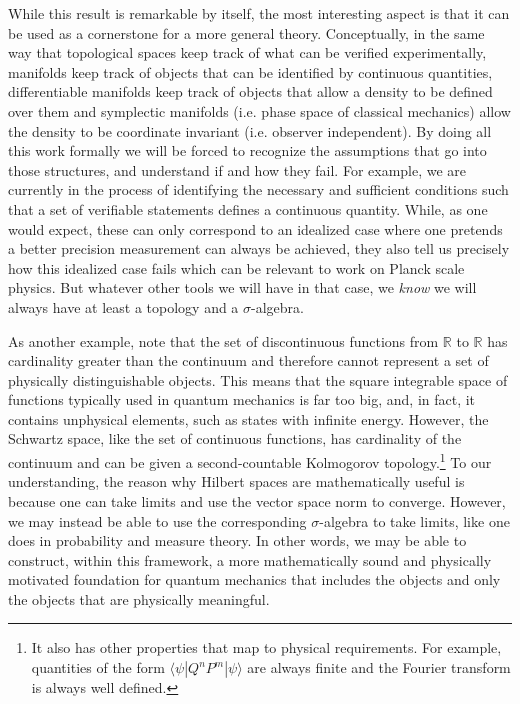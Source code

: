 \documentclass[letterpaper]{article}
\theoremstyle{plain}%
\theoremstyle{definition}
\theoremstyle{remark}
\numberwithin{equation}{section}
\begin{document}
While this result is remarkable by itself, the most interesting aspect is that it can be used as a cornerstone for a more general theory. Conceptually, in the same way that topological spaces keep track of what can be verified experimentally, manifolds keep track of objects that can be identified by continuous quantities, differentiable manifolds keep track of objects that allow a density to be defined over them and symplectic manifolds (i.e. phase space of classical mechanics) allow the density to be coordinate invariant (i.e. observer independent). By doing all this work formally we will be forced to recognize the assumptions that go into those structures, and understand if and how they fail. For example, we are currently in the process of identifying the necessary and sufficient conditions such that a set of verifiable statements defines a continuous quantity. While, as one would expect, these can only correspond to an idealized case where one pretends a better precision measurement can always be achieved, they also tell us precisely how this idealized case fails which can be relevant to work on Planck scale physics. But whatever other tools we will have in that case, we \emph{know} we will always have at least a topology and a $\sigma$-algebra.

As another example, note that the set of discontinuous functions from $\mathbb{R}$ to $\mathbb{R}$ has cardinality greater than the continuum and therefore cannot represent a set of physically distinguishable objects. This means that the square integrable space of functions typically used in quantum mechanics is far too big, and, in fact, it contains unphysical elements, such as states with infinite energy. However, the Schwartz space, like the set of continuous functions, has cardinality of the continuum and can be given a second-countable Kolmogorov topology.\footnote{It also has other properties that map to physical requirements. For example, quantities of the form $\langle \psi|Q^n P^m|\psi\rangle$ are always finite and the Fourier transform is always well defined.} To our understanding, the reason why Hilbert spaces are mathematically useful is because one can take limits and use the vector space norm to converge. However, we may instead be able to use the corresponding $\sigma$-algebra to take limits, like one does in probability and measure theory. In other words, we may be able to construct, within this framework, a more mathematically sound and physically motivated foundation for quantum mechanics that includes the objects and only the objects that are physically meaningful.
\end{document}
